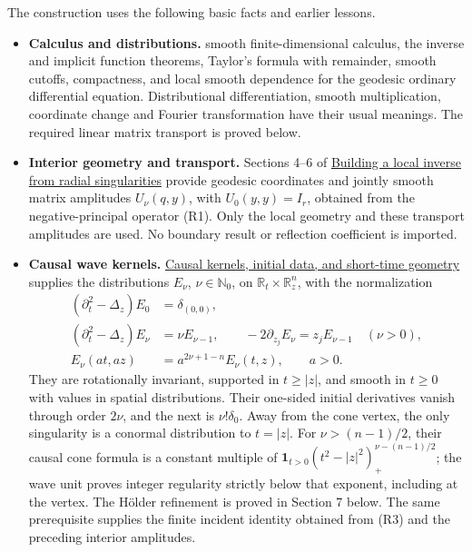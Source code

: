 \documentclass[
  11pt,
]{article}
\providecommand{\tightlist}{%
  \setlength{\itemsep}{0pt}\setlength{\parskip}{0pt}}
\begin{document}
The construction uses the following basic facts and earlier lessons.

\begin{itemize}
\tightlist
\item
  \textbf{Calculus and distributions.} smooth finite-dimensional
  calculus, the inverse and implicit function theorems, Taylor's formula
  with remainder, smooth cutoffs, compactness, and local smooth
  dependence for the geodesic ordinary differential equation.
  Distributional differentiation, smooth multiplication, coordinate
  change and Fourier transformation have their usual meanings. The
  required linear matrix transport is proved below.
\item
  \textbf{Interior geometry and transport.} Sections 4--6 of
  \href{elliptic-hadamard-parametrices.pdf}{Building a local inverse from
  radial singularities} provide geodesic coordinates and jointly smooth
  matrix amplitudes \(U_\nu(q,y)\), with \(U_0(y,y)=I_r\), obtained from
  the negative-principal operator (R1). Only the local geometry and
  these transport amplitudes are used. No boundary result or reflection
  coefficient is imported.
\item
  \textbf{Causal wave kernels.} \href{wave-hadamard-kernels.pdf}{Causal
  kernels, initial data, and short-time geometry} supplies the
  distributions \(E_\nu\), \(\nu\in\mathbb N_0\), on
  \(\mathbb R_t\times\mathbb R^n_z\), with the normalization \[
\begin{split}
 (\partial_t^2-\Delta_z)E_0&=\delta_{(0,0)},\\
 (\partial_t^2-\Delta_z)E_\nu&=\nu E_{\nu-1},\qquad
 -2\partial_{z_j}E_\nu=z_jE_{\nu-1}\quad(\nu>0),\\
 E_\nu(at,az)&=a^{2\nu+1-n}E_\nu(t,z),\qquad a>0.
\end{split}                                                     \tag{R3}
\] They are rotationally invariant, supported in \(t\geq|z|\), and
  smooth in \(t\geq0\) with values in spatial distributions. Their
  one-sided initial derivatives vanish through order \(2\nu\), and the
  next is \(\nu!\delta_0\). Away from the cone vertex, the only
  singularity is a conormal distribution to \(t=|z|\). For
  \(\nu>(n-1)/2\), their causal cone formula is a constant multiple of
  \(\boldsymbol1_{t>0}(t^2-|z|^2)_+^{\nu-(n-1)/2}\); the wave unit
  proves integer regularity strictly below that exponent, including at
  the vertex. The Hölder refinement is proved in Section 7 below. The
  same prerequisite supplies the finite incident identity obtained from
  (R3) and the preceding interior amplitudes.
\end{itemize}
\end{document}
